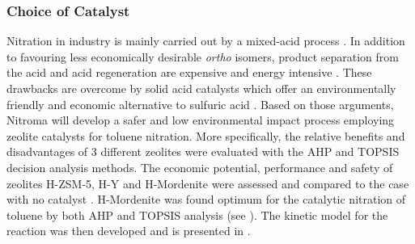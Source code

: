 \subsubsection{Choice of Catalyst}
Nitration in industry is mainly carried out by a mixed-acid process \cite{halder_nitration_2007}. In addition to favouring less economically desirable \textit{ortho} isomers, product separation from the acid and acid regeneration are expensive and energy intensive \cite{sreedhar_scientific_2013}. These drawbacks are overcome by solid acid catalysts which offer an environmentally friendly and economic alternative to sulfuric acid \cite{vassena_selective_1999}. Based on those arguments, Nitroma will develop a safer and low environmental impact process employing zeolite catalysts for toluene nitration. More specifically, the relative benefits and disadvantages of 3 different zeolites were evaluated with the AHP and TOPSIS decision analysis methods. The economic potential, performance and safety of zeolites H-ZSM-5, H-Y and H-Mordenite were assessed and compared to the case with no catalyst \cite{jeeru_kinetics_2018}. H-Mordenite was found optimum for the catalytic nitration of toluene by both AHP and TOPSIS analysis (see ). The kinetic model for the reaction was then developed and is presented in .

\begin{comment}
Nitration in industry is mainly carried out by a mixed-acid process, whereby sulfuric acid donates a proton to nitric acid, yielding a nitronium ion which will then react with toluene []. In addition to favouring less economically desirable \textit{ortho} isomers, product separation from the acid and acid regeneration are expensive and energy intensive \cite{sreedhar_scientific_2013}. These drawbacks can be overcome by using solid acid catalysts which offer an environmentally friendly and economic alternative to sulfuric acid \cite{vassena_selective_1999}. Based on those arguments, Nitroma will develop a safer and low environmental impact process employing zeolite catalysts for toluene nitration. More specifically, the relative benefits and disadvantages of 3 different zeolites were evaluated with the AHP and TOPSIS decision analysis methods to select the optimum catalyst. The economic potential, performance and safety of zeolites H-ZSM-5, H-Y and H-Mordenite were assessed and compared to the case with no catalyst \cite{jeeru_kinetics_2018}. The economic potential was measured with the cost of the catalyst and the percentage of undesirable by-product formed. Conversion and the NFPA score are the KPIs for performance and safety respectively. H-Mordenite was found optimum for the catalytic nitration of toluene by both AHP and TOPSIS analysis (\Cref{app:matrix}). The kinetic model for the reaction was then developed and is presented in \Cref{app:kinetics}.
\end{comment}


